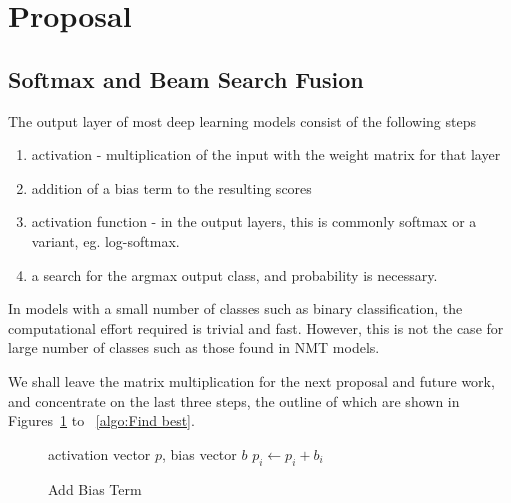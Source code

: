 \documentclass[]{article}
\begin{document}
\section{Proposal}
\label{sec:Proposal}

\subsection{Softmax and Beam Search Fusion}

The output layer of most deep learning models consist of the following steps
\begin{enumerate}
   \item \vspace{-2 mm} activation - multiplication of the input with the weight matrix for that layer
   \item \vspace{-2 mm} addition of a bias term to the resulting scores
   \item \vspace{-2 mm} activation function - in the output layers, this is commonly softmax or a variant, eg. log-softmax.
   \item \vspace{-2 mm} a search for the argmax output class, and probability is necessary.
\end{enumerate}

In models with a small number of classes such as binary classification, the computational effort required is trivial and fast. However, this is not the case for large number of classes such as those found in NMT models.

We shall leave the matrix multiplication for the next proposal and future work, and concentrate on the last three steps, the outline of which are shown in Figures~\ref{algo:Add Bias Term} to ~\ref{algo:Find best}.

\begin{figure} [h]
\begin{algorithmic}
\REQUIRE activation vector $p$, bias vector $b$
  \STATE $p_i \gets p_i + b_i$
\ENDFOR 
\end{algorithmic}
\caption{Add Bias Term}
\label{algo:Add Bias Term}
\end{figure}
\end{document}
